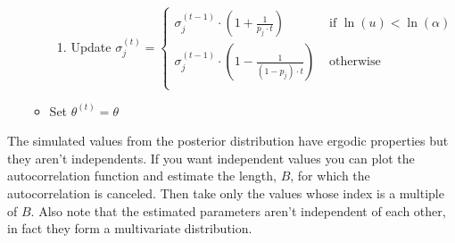 \documentclass[11pt,fleqn]{book} %
\begin{document}
\begin{algorithm}
\begin{enumerate}
\begin{itemize}
\begin{enumerate}[label=\alph*.]
				\item Update $\sigma_j^{(t)} = \left\{
					\begin{array}{ll}
						\sigma_j^{(t-1)} \cdot \left( 1 + \frac{1}{p_j \cdot t} \right) & \text{ if } \ln(u) < \ln(\alpha) \\
						\sigma_j^{(t-1)} \cdot \left( 1 - \frac{1}{(1-p_j) \cdot t} \right) & \text{ otherwise } \\
					\end{array}
				\right.$
			\end{enumerate}
			\item Set $\theta^{(t)}=\theta$
		\end{itemize}
	\end{enumerate}
\end{algorithm}

The simulated values from the posterior distribution have ergodic properties but
they aren't independents. If you want independent values you can plot the 
autocorrelation function and estimate the length, $B$, for which the autocorrelation 
is canceled. Then take only the values whose index is a multiple of $B$. Also
note that the estimated parameters aren't independent of each other, in fact 
they form a multivariate distribution.
\end{document}
